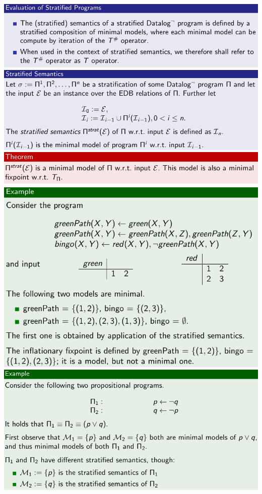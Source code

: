 \documentclass{article}
\begin{document}
\includegraphics[scale=0.3]{97.png}\\
\includegraphics[scale=0.3]{98.png}\\
\includegraphics[scale=0.3]{99.png}\\
\includegraphics[scale=0.3]{100.png}\\
\includegraphics[scale=0.3]{101.png}\\
\end{document}
